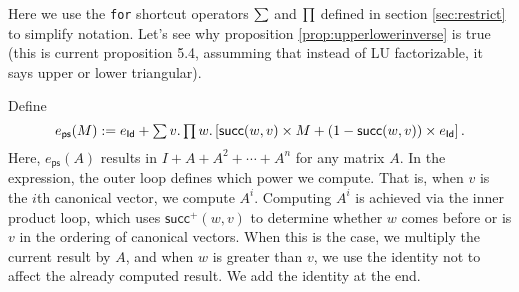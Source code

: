 Here we use the \texttt{for} shortcut operators $\textstyle\sum$ and $\textstyle\prod$ defined in section \ref{sec:restrict} to simplify notation. 
Let's see why proposition \ref{prop:upperlowerinverse} is true (this is current proposition 5.4, assumming that instead of LU factorizable, it says upper or lower triangular).

Define
$$
e_{\mathsf{ps}}(M):= e_{\mathsf{Id}} + \textstyle\sum v.\textstyle\prod w. \left[ \mathsf{succ}(w,v)\times M + (1 - \mathsf{succ}(w,v))\times e_{\mathsf{Id}} \right].
$$
Here, $e_{\mathsf{ps}}(A)$ results in $I+A+A^2+\cdots + A^n$ for any matrix $A$. In the expression, the outer loop defines which power we compute. 
That is, when $v$ is the $i$th canonical vector, we compute $A^i$.
Computing $A^i$ is achieved via the inner product loop, which uses $\mathsf{succ}^+(w,v)$ to 
determine whether $w$ comes before or is $v$ in the ordering of canonical vectors.
When this is the case, we multiply the current result by $A$, and when $w$ is greater 
than $v$, we use the identity not to affect the already computed result. We add the identity at the end.

